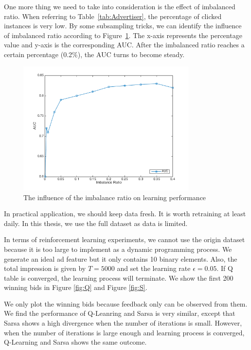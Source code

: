 One more thing we need to take into consideration is the effect of imbalanced ratio. When referring to Table~\ref{tab:Advertiser}, the percentage of clicked instances is very low. By some subsampling tricks, we can identify the influence of imbalanced ratio according to Figure~\ref{fig:imbalance}. The x-axis represents the percentage value and y-axis is the corresponding AUC. After the imbalanced ratio reaches a certain percentage (0.2$\%$), the AUC turns to become steady.

\begin{figure}[htbp]
\centering
\includegraphics[width=0.8\textwidth]{imbalance.png}
\caption{The influence of the imbalance ratio on learning performance}
\label{fig:imbalance}
\end{figure}

In practical application, we should keep data fresh. It is worth retraining at least daily. In this thesis, we use the full dataset as data is limited.

In terms of reinforcement learning experiments, we cannot use the origin dataset because it is too large to implement as a dynamic programming process. We generate an ideal ad feature but it only contains 10 binary elements. Also, the total impression is given by $T=5000$ and set the learning rate $\epsilon=0.05$. If Q table is converged, the learning process will terminate. We show the first 200 winning bids in Figure \ref{fig:Q} and Figure \ref{fig:S}. 

We only plot the winning bids because feedback only can be observed from them. We find the performance of Q-Leanring and Sarsa is very similar, except that Sarsa shows a high divergence when the number of iterations is small. However, when the number of iterations is large enough and learning process is converged, Q-Learning and Sarsa shows the same outcome. 

